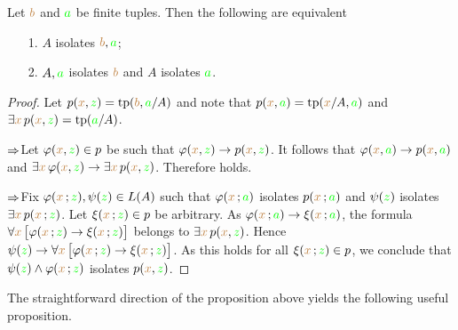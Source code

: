\documentclass[creche.tex]{subfiles}
\begin{document}

\begin{proposition}
Let ${\mr b}$ and ${\gr a}$ be finite tuples.
Then the following are equivalent
\begin{itemize}
\item[1.] $A$ isolates  ${\mr b},{\gr a}$;
\item[2.] $A,{\gr a}$ isolates ${\mr b}$ and $A$ isolates ${\gr a}$.
\end{itemize}
\end{proposition}
\begin{proof}
Let $p({\mr x},{\gr z})=\tp ({\mr b},{\gr a}/A)$ and note that  $p({\mr x},{\gr a})=\tp({\mr x}/A,{\gr a})$ and $\E{\mr x}\,p({\mr x},{\gr z})=\tp({\gr a}/A)$.


$\IMP$\quad Let $\phi({\mr x},{\gr z})\in p$ be such that $\phi({\mr x},{\gr z})\imp p({\mr x},{\gr z})$.
It follows that $\phi({\mr x},{\gr a})\imp p({\mr x},{\gr a})$ and $\E{\mr x}\, \phi({\mr x},{\gr z})\imp \E{\mr x}\,p({\mr x},{\gr z})$.
Therefore  holds.

$\IMP$\quad Fix $\phi({\mr x}\,;{\gr z}), \psi({\gr z})\in L(A)$ such that $\phi({\mr x}\,;{\gr a})$ isolates $p({\mr x}\,;{\gr a})$ and $\psi({\gr z})$ isolates $\E {\mr x}\, p({\mr x}\,;{\gr z})$.
Let $\xi({\mr x}\,;{\gr z})\in p$ be arbitrary.
As $\phi({\mr x}\,;{\gr a})\imp\xi({\mr x}\,;{\gr a})$, the formula $\A{\mr x}\,\big[\phi({\mr x}\,;{\gr z})\imp\xi({\mr x}\,;{\gr z})\big]$ belongs to $\E {\mr x}\, p({\mr x},{\gr z})$.
Hence $\psi({\gr z})\imp\A{\mr x}\,\big[\phi({\mr x}\,;{\gr z})\imp\xi({\mr x}\,;{\gr z})\big]$.
As this holds for all $\xi({\mr x}\,;{\gr z})\in p$, we conclude that $\psi({\gr z})\wedge\phi({\mr x}\,;{\gr z})$ isolates  $p({\mr x},{\gr z})$.
\end{proof}

The straightforward direction of the proposition above yields the following useful proposition.
\end{document}
